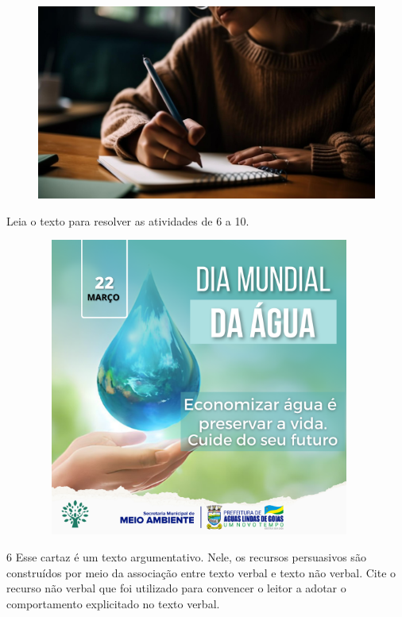 \begin{figure}[H]
\centering
\includegraphics[height=.25\textheight]{./imgSAEB_8_POR/media/image42.png}
\end{figure}

Leia o texto para resolver as atividades de 6 a 10.

\begin{figure}[H]
\centering
\includegraphics[width=4.21103in,height=3.86458in]{./imgSAEB_8_POR/media/image41.png}
\end{figure}

\num{6} Esse cartaz é um texto argumentativo. Nele, os recursos
persuasivos são construídos por meio da associação entre texto verbal e
texto não verbal. Cite o recurso não verbal que foi utilizado para
convencer o leitor a adotar o comportamento explicitado no texto verbal.


